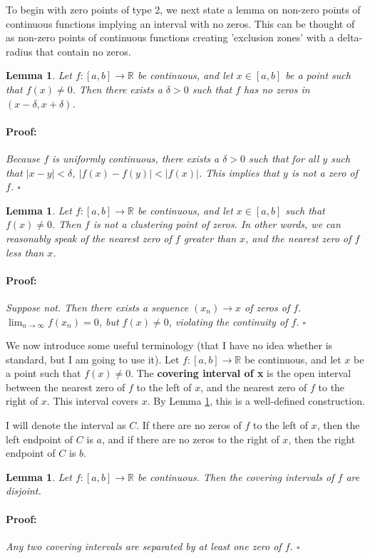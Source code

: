 \documentclass{article}
\newenvironment{proof}{\paragraph{Proof:}}{\hfill$\square$}
\newtheorem{lemma}[theorem]{Lemma}
\newcommand{\R}{\mathbb{R}}
\begin{document}
To begin with zero points of type 2, we next state a lemma on non-zero points of continuous functions implying an interval with no zeros. This can be thought of as non-zero points of continuous functions creating 'exclusion zones' with a delta-radius that contain no zeros.

\begin{lemma}
\label{ExclusionZoneDelta}
Let $f: [a, b] \rightarrow \R$ be continuous, and let $x \in [a, b]$ be a point such that $f(x) \neq 0$. Then there exists a $\delta > 0$ such that $f$ has no zeros in $(x-\delta, x+\delta)$.
\begin{proof}
Because $f$ is uniformly continuous, there exists a $\delta > 0$ such that for all $y$ such that $|x-y| < \delta$, $|f(x) - f(y)| < |f(x)|$. This implies that $y$ is not a zero of $f$.
\end{proof}
\end{lemma}

\begin{lemma}
\label{LemmaType2NotCluster}
Let $f: [a, b] \rightarrow \R$ be continuous, and let $x \in [a, b]$ such that $f(x) \neq 0$. Then $f$ is not a clustering point of zeros. In other words, we can reasonably speak of the nearest zero of $f$ greater than $x$, and the nearest zero of $f$ less than $x$.
\begin{proof}
Suppose not. Then there exists a sequence $(x_n) \rightarrow x$ of zeros of $f$. $\lim_{n \rightarrow \infty} f(x_n) = 0$, but $f(x) \neq 0$, violating the continuity of $f$.
\end{proof}
\end{lemma}

We now introduce some useful terminology (that I have no idea whether is standard, but I am going to use it). Let $f: [a, b] \rightarrow \R$ be continuous, and let $x$ be a point such that $f(x) \neq 0$. The \textbf{covering interval of x} is the open interval between the nearest zero of $f$ to the left of $x$, and the nearest zero of $f$ to the right of $x$. This interval covers $x$. By Lemma \ref{LemmaType2NotCluster}, this is a well-defined construction.

I will denote the interval as $C$. If there are no zeros of $f$ to the left of $x$, then the left endpoint of $C$ is $a$, and if there are no zeros to the right of $x$, then the right endpoint of $C$ is $b$.

\begin{lemma}
Let $f: [a, b] \rightarrow \R$ be continuous. Then the covering intervals of $f$ are disjoint.
\begin{proof}
Any two covering intervals are separated by at least one zero of $f$.
\end{proof}
\end{lemma}
\end{document}
